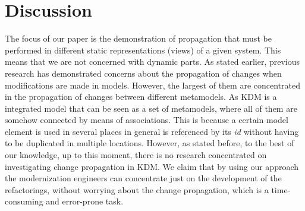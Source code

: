 
\section{Discussion}\label{sec:a_brief_discussion}

The focus of our paper is the demonstration of propagation that must be performed in different static representations (views) of a given system. This means that we are not concerned with dynamic parts.
As stated earlier, previous research has demonstrated concerns about the propagation of changes when modifications are made in models. However, the largest of them are concentrated in the propagation of changes between different metamodels. As KDM is a integrated model that can be seen as a set of metamodels, where all of them are somehow connected by means of associations. This is because a certain model element is used in several places in general is referenced by its \textit{id} without having to be duplicated in multiple locations. However, as stated before, to the best of our knowledge, up to this moment, there is no research concentrated on investigating change propagation in KDM. We claim that by using our approach the modernization engineers can concentrate just on the development of the refactorings, without worrying about the change propagation, which is a time-consuming and error-prone task.


